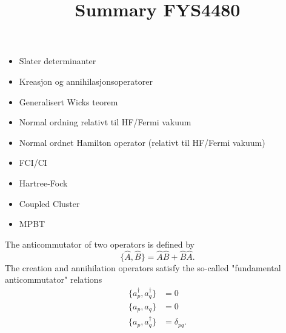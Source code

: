 \documentclass[a4paper,10pt]{report}
\title{Summary FYS4480}
\author{}
\begin{document}
\maketitle

\begin{itemize}
 \item Slater determinanter
 \item Kreasjon og annihilasjonsoperatorer
 \item Generalisert Wicks teorem
 \item Normal ordning relativt til HF/Fermi vakuum
 \item Normal ordnet Hamilton operator (relativt til HF/Fermi vakuum)
 \item FCI/CI
 \item Hartree-Fock
 \item Coupled Cluster 
 \item MPBT
\end{itemize}

The anticommutator of two operators is defined by
\begin{equation}
 \{\hat{A},\hat{B}\} = \hat{A}\hat{B}+\hat{B}\hat{A}.                      
\end{equation}
The creation and annihilation operators satisfy the so-called "fundamental anticommutator" relations
\begin{align}
 \{a_p^\dagger,a_q^\dagger \} &= 0\\
 \{a_p,a_q \} &= 0\\
 \{a_p,a_q^\dagger \} &= \delta_{pq}.\\
\end{align}
\end{document}
